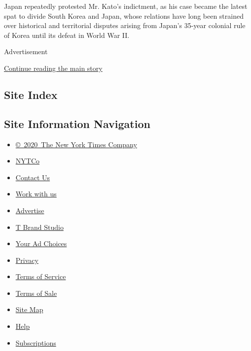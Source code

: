 Japan repeatedly protested Mr. Kato's indictment, as his case became the
latest spat to divide South Korea and Japan, whose relations have long
been strained over historical and territorial disputes arising from
Japan's 35-year colonial rule of Korea until its defeat in World War II.

Advertisement

\protect\hyperlink{after-bottom}{Continue reading the main story}

\hypertarget{site-index}{%
\subsection{Site Index}\label{site-index}}

\hypertarget{site-information-navigation}{%
\subsection{Site Information
Navigation}\label{site-information-navigation}}

\begin{itemize}
\tightlist
\item
  \href{https://help.nytimes3xbfgragh.onion/hc/en-us/articles/115014792127-Copyright-notice}{©~2020~The
  New York Times Company}
\end{itemize}

\begin{itemize}
\tightlist
\item
  \href{https://www.nytco.com/}{NYTCo}
\item
  \href{https://help.nytimes3xbfgragh.onion/hc/en-us/articles/115015385887-Contact-Us}{Contact
  Us}
\item
  \href{https://www.nytco.com/careers/}{Work with us}
\item
  \href{https://nytmediakit.com/}{Advertise}
\item
  \href{http://www.tbrandstudio.com/}{T Brand Studio}
\item
  \href{https://www.nytimes3xbfgragh.onion/privacy/cookie-policy\#how-do-i-manage-trackers}{Your
  Ad Choices}
\item
  \href{https://www.nytimes3xbfgragh.onion/privacy}{Privacy}
\item
  \href{https://help.nytimes3xbfgragh.onion/hc/en-us/articles/115014893428-Terms-of-service}{Terms
  of Service}
\item
  \href{https://help.nytimes3xbfgragh.onion/hc/en-us/articles/115014893968-Terms-of-sale}{Terms
  of Sale}
\item
  \href{https://spiderbites.nytimes3xbfgragh.onion}{Site Map}
\item
  \href{https://help.nytimes3xbfgragh.onion/hc/en-us}{Help}
\item
  \href{https://www.nytimes3xbfgragh.onion/subscription?campaignId=37WXW}{Subscriptions}
\end{itemize}
